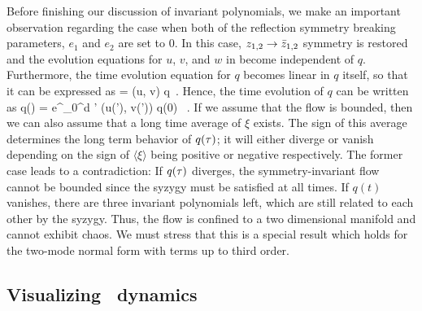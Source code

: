 \documentclass[aip,cha,
reprint,
secnumarabic,
nofootinbib, tightenlines,
nobibnotes, showkeys, showpacs,
superscriptaddress,
]{revtex4-1}
\begin{document}
Before finishing our discussion of invariant polynomials, we make 
an important observation regarding the case when both of the 
reflection symmetry breaking parameters, $e_{1}$ and $e_2$ are set 
to $0$. In this case, $z_{1,2} \rightarrow \bar{z}_{1,2}$ 
symmetry is restored and the evolution equations for $u$, $v$, and 
$w$ in  become independent of $q$. Furthermore, 
the time evolution equation for $q$ becomes linear in $q$ itself, 
so that it can be expressed as
\beq
     = \xi (u, v) q \,.
Hence, the time evolution of $q$ can be written as
\beq
    q(\zeit) =  e^{\int_0^\zeit d \zeit' \xi (u(\zeit'), v(\zeit'))} q(0) \, .
If we assume that the flow is bounded, then we can also assume 
that a long time average of $\xi$ exists. The sign of this average 
determines the long term behavior of $q(\tau)$; it will either 
diverge or vanish depending on the sign of $\langle \xi \rangle$ 
being positive or negative respectively. The former case leads to 
a contradiction: If $q(\tau)$ diverges, the symmetry-invariant 
flow cannot be bounded since the syzygy  must be 
satisfied at all times. If $q(t)$ vanishes, there are three 
invariant polynomials left, which are still related to each other 
by the syzygy. Thus, the flow is confined to a two dimensional 
manifold and cannot exhibit chaos. We must stress that this is a 
special result which holds for the two-mode normal form with terms 
up to third order.

\subsection{Visualizing \twomode\ dynamics}
\label{s:visual}
\end{document}
